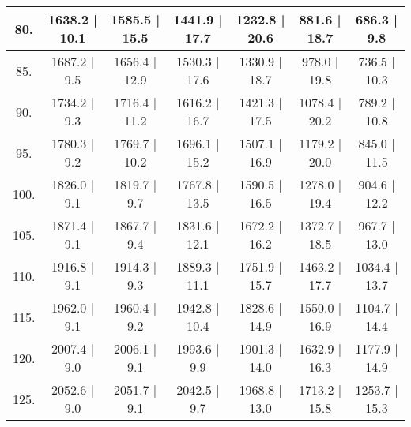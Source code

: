 \begin{tabular}{|c||c|c|c|c|c|c|}
\hline
  80. &   1638.2 |    10.1 &   1585.5 |    15.5 &   1441.9 |    17.7 &   1232.8 |    20.6 &    881.6 |    18.7 &    686.3 |     9.8\tabularnewline
\hline
  85. &   1687.2 |     9.5 &   1656.4 |    12.9 &   1530.3 |    17.6 &   1330.9 |    18.7 &    978.0 |    19.8 &    736.5 |    10.3\tabularnewline
\hline
  90. &   1734.2 |     9.3 &   1716.4 |    11.2 &   1616.2 |    16.7 &   1421.3 |    17.5 &   1078.4 |    20.2 &    789.2 |    10.8\tabularnewline
\hline
  95. &   1780.3 |     9.2 &   1769.7 |    10.2 &   1696.1 |    15.2 &   1507.1 |    16.9 &   1179.2 |    20.0 &    845.0 |    11.5\tabularnewline
\hline
 100. &   1826.0 |     9.1 &   1819.7 |     9.7 &   1767.8 |    13.5 &   1590.5 |    16.5 &   1278.0 |    19.4 &    904.6 |    12.2\tabularnewline
\hline
 105. &   1871.4 |     9.1 &   1867.7 |     9.4 &   1831.6 |    12.1 &   1672.2 |    16.2 &   1372.7 |    18.5 &    967.7 |    13.0\tabularnewline
\hline
 110. &   1916.8 |     9.1 &   1914.3 |     9.3 &   1889.3 |    11.1 &   1751.9 |    15.7 &   1463.2 |    17.7 &   1034.4 |    13.7\tabularnewline
\hline
 115. &   1962.0 |     9.1 &   1960.4 |     9.2 &   1942.8 |    10.4 &   1828.6 |    14.9 &   1550.0 |    16.9 &   1104.7 |    14.4\tabularnewline
\hline
 120. &   2007.4 |     9.0 &   2006.1 |     9.1 &   1993.6 |     9.9 &   1901.3 |    14.0 &   1632.9 |    16.3 &   1177.9 |    14.9\tabularnewline
\hline
 125. &   2052.6 |     9.0 &   2051.7 |     9.1 &   2042.5 |     9.7 &   1968.8 |    13.0 &   1713.2 |    15.8 &   1253.7 |    15.3\tabularnewline
\hline
\end{tabular}
